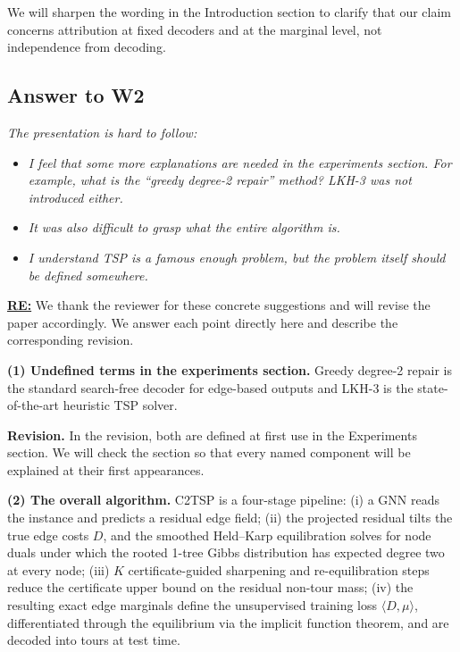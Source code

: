 We will sharpen the wording in the Introduction section to clarify that our claim concerns attribution at fixed decoders and at the marginal level, not independence from decoding.

\subsection{Answer to W2}

\textit{The presentation is hard to follow:}

\begin{itemize}
    \item \textit{I feel that some more explanations are needed in the experiments section. For example, what is the ``greedy degree-2 repair'' method? LKH-3 was not introduced either.}
    \item \textit{It was also difficult to grasp what the entire algorithm is.}
    \item \textit{I understand TSP is a famous enough problem, but the problem itself should be defined somewhere.}
\end{itemize}


\textbf{\underline{RE:}}
We thank the reviewer for these concrete suggestions and will revise the paper accordingly. We answer each point directly here and describe the corresponding revision.

\textbf{(1) Undefined terms in the experiments section.} Greedy degree-2 repair is the standard search-free decoder for edge-based outputs and LKH-3 is the state-of-the-art heuristic TSP solver.

\textbf{Revision.}
In the revision, both are defined at first use in the Experiments section. We will check the section so that every named component
will be explained at their first appearances.

\textbf{(2) The overall algorithm.} C2TSP is a four-stage pipeline: (i) a GNN reads the instance and predicts a residual edge field; (ii) the projected residual tilts the true edge costs $D$, and the smoothed Held–Karp equilibration solves for node duals under which the rooted 1-tree Gibbs distribution has expected degree two at every node; (iii) $K$ certificate-guided sharpening and re-equilibration steps reduce the certificate upper bound on the residual non-tour mass; (iv) the resulting exact edge marginals define the unsupervised training loss $\langle D,\mu\rangle$, differentiated through the equilibrium via the implicit function theorem, and are decoded into tours at test time. 

